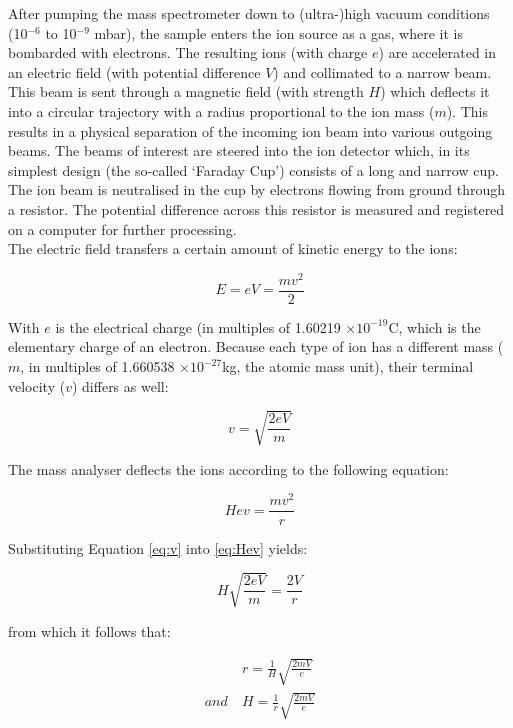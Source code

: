 \documentclass{book}
\begin{document}
After pumping the mass spectrometer down to (ultra-)high vacuum
conditions (10$^{-6}$ to 10$^{-9}$ mbar), the sample enters the ion
source as a gas, where it is bombarded with electrons.  The resulting
ions (with charge $e$) are accelerated in an electric field (with
potential difference $V$) and collimated to a narrow beam. This beam
is sent through a magnetic field (with strength $H$) which deflects it
into a circular trajectory with a radius proportional to the ion mass
($m$).  This results in a physical separation of the incoming ion beam
into various outgoing beams. The beams of interest are steered into
the ion detector which, in its simplest design (the so-called `Faraday
Cup') consists of a long and narrow cup. The ion beam is neutralised
in the cup by electrons flowing from ground through a resistor. The
potential difference across this resistor is measured and registered
on a computer for further processing.\\

The electric field transfers a certain amount of kinetic energy to the
ions:

\begin{equation}
E = e V = \frac{m v^2}{2}
\label{eq:E}
\end{equation}

With $e$ is the electrical charge (in multiples of 1.60219 $\times
10^{-19}$C, which is the elementary charge of an electron.  Because
each type of ion has a different mass ($m$, in multiples of 1.660538
$\times 10^{-27}$kg, the atomic mass unit), their terminal velocity
($v$) differs as well:

\begin{equation}
v = \sqrt{\frac{2 e V}{m}}
\label{eq:v}
\end{equation}

The mass analyser deflects the ions according to the following equation:

\begin{equation}
H e v = \frac{m v^2}{r}
\label{eq:Hev}
\end{equation}

Substituting Equation \ref{eq:v} into \ref{eq:Hev} yields:

\begin{equation}
H \sqrt{\frac{2 e V}{m}} = \frac{2 V}{r}
\label{eq:H2eVm}
\end{equation}

from which it follows that:

\begin{equation}
\begin{array}{rl}
~ & r = \frac{1}{H}\sqrt{\frac{2 m V}{e}} \\
and~ & H = \frac{1}{r}\sqrt{\frac{2 m V}{e}}\\
\end{array}
\label{eq:rH}
\end{equation}
\end{document}

